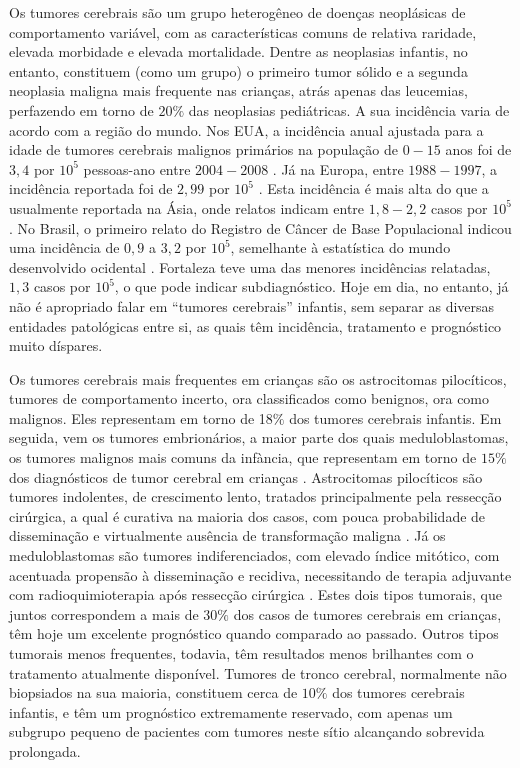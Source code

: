 \documentclass[11pt,a4paper,oldfontcommands]{memoir}
\begin{document}
Os tumores cerebrais são um grupo heterogêneo de doenças neoplásicas de comportamento variável, com as características comuns de relativa raridade, elevada morbidade e elevada mortalidade. Dentre as neoplasias infantis, no entanto, constituem (como um grupo) o primeiro tumor sólido e a segunda neoplasia maligna mais frequente nas crianças, atrás apenas das leucemias, perfazendo em torno de \(20\%\) das neoplasias pediátricas. A sua incidência varia de acordo com a região do mundo. Nos EUA, a incidência anual ajustada para a idade de tumores cerebrais malignos primários na população de \(0-15\) anos foi de \(3,4\) por \(10^5\) pessoas-ano entre \(2004-2008\) \cite{Ostrom01102014}. Já na Europa, entre \(1988-1997\), a incidência reportada foi de \(2,99\) por \(10^5\) \cite{Peris-Bonet}. Esta incidência é mais alta do que a usualmente reportada na Ásia, onde relatos indicam entre \(1,8-2,2\) casos por \(10^5\) \cite{CNCR21430}. No Brasil, o primeiro relato do Registro de Câncer de Base Populacional indicou uma incidência de \(0,9\) a \(3,2\) por \(10^5\), semelhante à estatística do mundo desenvolvido ocidental \cite{IJC24799}. Fortaleza teve uma das menores incidências relatadas, \(1,3\) casos por \(10^5\), o que pode indicar subdiagnóstico. Hoje em dia, no entanto, já não é apropriado falar em “tumores cerebrais” infantis, sem separar as diversas entidades patológicas entre si, as quais têm incidência, tratamento e prognóstico muito díspares.

Os tumores cerebrais mais frequentes em crianças são os astrocitomas pilocíticos, tumores de comportamento incerto, ora classificados como benignos, ora como malignos. Eles representam em torno de 1\(8\%\) dos tumores cerebrais infantis. Em seguida, vem os tumores embrionários, a maior parte dos quais meduloblastomas, os tumores malignos mais comuns da infància, que representam em torno de \(15\%\) dos diagnósticos de tumor cerebral em crianças \cite{Ostrom01102014}. Astrocitomas pilocíticos são tumores indolentes, de crescimento lento, tratados principalmente pela ressecção cirúrgica, a qual é curativa na maioria dos casos, com pouca probabilidade de disseminação e virtualmente ausência de transformação maligna \cite{gan}. Já os meduloblastomas são tumores indiferenciados, com elevado índice mitótico, com acentuada propensão à disseminação e recidiva, necessitando de terapia adjuvante com radioquimioterapia após ressecção cirúrgica \cite{partap}. Estes dois tipos tumorais, que juntos correspondem a mais de \(30\%\) dos casos de tumores cerebrais em crianças, têm hoje um excelente prognóstico quando comparado ao passado. Outros tipos tumorais menos frequentes, todavia, têm resultados menos brilhantes com o tratamento atualmente disponível. Tumores de tronco cerebral, normalmente não biopsiados na sua maioria, constituem cerca de \(10\%\) dos tumores cerebrais infantis, e têm um prognóstico extremamente reservado, com apenas um subgrupo pequeno de pacientes com tumores neste sítio alcançando sobrevida prolongada.
\end{document}
